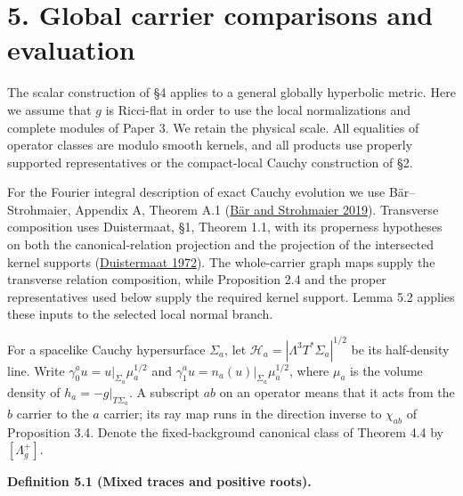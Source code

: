 \documentclass[
  english,
  11pt,
  reqno]{amsart}
\makeatletter
\newcommand{\pandocstatementheading}[1]{%
  \par\addpenalty{\@beginparpenalty}%
  \addvspace{.5\baselineskip plus .2\baselineskip minus .2\baselineskip}%
  {\normalfont\bfseries #1\par}%
  \nobreak\@afterindenttrue\@afterheading
}
\makeatother
\begin{document}
\section{5. Global carrier comparisons and
evaluation}\label{global-carrier-comparisons-and-evaluation}

The scalar construction of §4 applies to a general globally hyperbolic
metric. Here we assume that \(g\) is Ricci-flat in order to use the
local normalizations and complete modules of Paper 3. We retain the
physical scale. All equalities of operator classes are modulo smooth
kernels, and all products use properly supported representatives or the
compact-local Cauchy construction of §2.

For the Fourier integral description of exact Cauchy evolution we use
Bär--Strohmaier, Appendix A, Theorem A.1
(\hyperref[ref-BarStrohmaier2019]{Bär and Strohmaier 2019}). Transverse
composition uses Duistermaat, §1, Theorem 1.1, with its properness
hypotheses on both the canonical-relation projection and the projection
of the intersected kernel supports
(\hyperref[ref-Duistermaat1972]{Duistermaat 1972}). The whole-carrier
graph maps supply the transverse relation composition, while Proposition
2.4 and the proper representatives used below supply the required kernel
support. Lemma 5.2 applies these inputs to the selected local normal
branch.

For a spacelike Cauchy hypersurface \(\Sigma_a\), let
\(\mathcal H_a=|\Lambda^3T^*\Sigma_a|^{1/2}\) be its half-density line.
Write \(\gamma_0^a u=u|_{\Sigma_a}\mu_a^{1/2}\) and
\(\gamma_1^a u=n_a(u)|_{\Sigma_a}\mu_a^{1/2}\), where \(\mu_a\) is the
volume density of \(h_a=-g|_{T\Sigma_a}\). A subscript \(ab\) on an
operator means that it acts from the \(b\) carrier to the \(a\) carrier;
its ray map runs in the direction inverse to \(\chi_{ab}\) of
Proposition 3.4. Denote the fixed-background canonical class of Theorem
4.4 by \([\Lambda_g^+]\).

\pandocstatementheading{\protect{}\label{def:global-mixed-carrier-traces}Definition 5.1 (Mixed traces and positive roots).}
\end{document}
